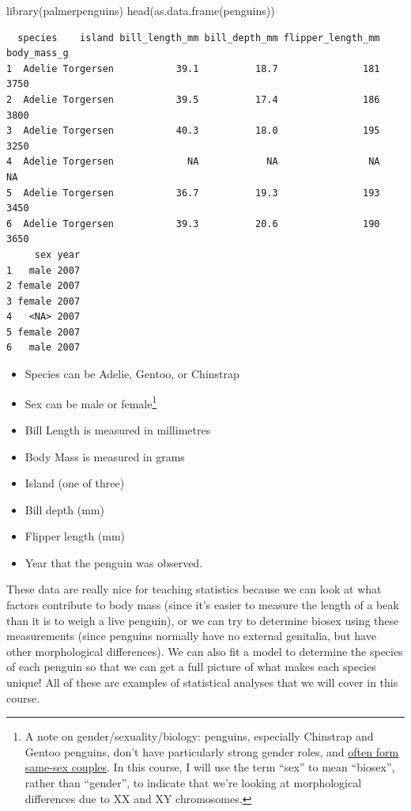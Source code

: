 \documentclass[
  letterpaper,
  DIV=11,
  numbers=noendperiod,
  oneside]{scrreprt}
\newenvironment{Shaded}{\begin{snugshade}}{\end{snugshade}}
\newcommand{\FunctionTok}[1]{\textcolor[rgb]{0.28,0.35,0.67}{#1}}
\newcommand{\NormalTok}[1]{\textcolor[rgb]{0.00,0.23,0.31}{#1}}
\providecommand{\tightlist}{%
  \setlength{\itemsep}{0pt}\setlength{\parskip}{0pt}}\usepackage{longtable,booktabs,array}
\begin{document}
\begin{Shaded}
\begin{Highlighting}[]
\FunctionTok{library}\NormalTok{(palmerpenguins)}
\FunctionTok{head}\NormalTok{(}\FunctionTok{as.data.frame}\NormalTok{(penguins))}
\end{Highlighting}
\end{Shaded}

\begin{verbatim}
  species    island bill_length_mm bill_depth_mm flipper_length_mm body_mass_g
1  Adelie Torgersen           39.1          18.7               181        3750
2  Adelie Torgersen           39.5          17.4               186        3800
3  Adelie Torgersen           40.3          18.0               195        3250
4  Adelie Torgersen             NA            NA                NA          NA
5  Adelie Torgersen           36.7          19.3               193        3450
6  Adelie Torgersen           39.3          20.6               190        3650
     sex year
1   male 2007
2 female 2007
3 female 2007
4   <NA> 2007
5 female 2007
6   male 2007
\end{verbatim}

\begin{itemize}
\tightlist
\item
  Species can be Adelie, Gentoo, or Chinstrap
\item
  Sex can be male or female\footnote{A note on gender/sexuality/biology:
    penguins, especially Chinstrap and Gentoo penguins, don't have
    particularly strong gender roles, and
    \href{https://sites.tufts.edu/museumstudents/2021/02/22/whats-with-all-the-gay-penguins/}{often
    form same-sex couples}. In this course, I will use the term ``sex''
    to mean ``biosex'', rather than ``gender'', to indicate that we're
    looking at morphological differences due to XX and XY chromosomes.}
\item
  Bill Length is measured in millimetres
\item
  Body Mass is measured in grams
\item
  Island (one of three)
\item
  Bill depth (mm)
\item
  Flipper length (mm)
\item
  Year that the penguin was observed.
\end{itemize}

These data are really nice for teaching statistics because we can look
at what factors contribute to body mass (since it's easier to measure
the length of a beak than it is to weigh a live penguin), or we can try
to determine biosex using these measurements (since penguins normally
have no external genitalia, but have other morphological differences).
We can also fit a model to determine the species of each penguin so that
we can get a full picture of what makes each species unique! All of
these are examples of statistical analyses that we will cover in this
course.
\end{document}
